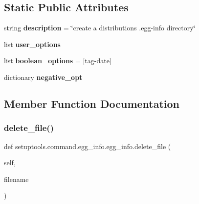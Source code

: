 \subsection*{Static Public Attributes}
\begin{DoxyCompactItemize}
\item 
\mbox{\label{classsetuptools_1_1command_1_1egg__info_1_1egg__info_a934bb82d16eaa4541b2bad5096ba8a14}} 
string {\bfseries description} = \char`\"{}create a distribution\textquotesingle{}s .egg-\/info directory\char`\"{}
\item 
list {\bfseries user\+\_\+options}
\item 
\mbox{\label{classsetuptools_1_1command_1_1egg__info_1_1egg__info_ae46504dc1aff8a623829bdb3a6520059}} 
list {\bfseries boolean\+\_\+options} = \mbox{[}\textquotesingle{}tag-\/date\textquotesingle{}\mbox{]}
\item 
dictionary {\bfseries negative\+\_\+opt}
\end{DoxyCompactItemize}


\subsection{Member Function Documentation}
\mbox{\label{classsetuptools_1_1command_1_1egg__info_1_1egg__info_a6fa3267879d13f06600d4d1e42c26068}} 
\subsubsection{\texorpdfstring{delete\+\_\+file()}{delete\_file()}}
{\footnotesize\ttfamily def setuptools.\+command.\+egg\+\_\+info.\+egg\+\_\+info.\+delete\+\_\+file (\begin{DoxyParamCaption}\item[{}]{self,  }\item[{}]{filename }\end{DoxyParamCaption})}

